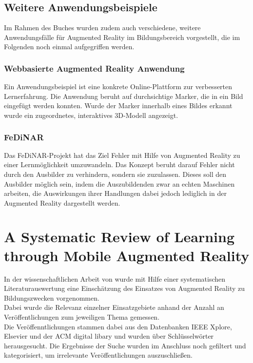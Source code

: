 \subsection{Weitere Anwendungsbeispiele}
Im Rahmen des Buches wurden zudem auch verschiedene, weitere Anwendungsfälle für Augmented Reality im Bildungsbereich vorgestellt, die im Folgenden noch einmal aufgegriffen werden. 

\subsubsection{Webbasierte Augmented Reality Anwendung}
Ein Anwendungsbeispiel ist eine konkrete Online-Plattform zur verbesserten Lernerfahrung. Die Anwendung beruht auf \glqq durchsichtige\grqq{} Marker, die in ein Bild eingefügt werden konnten. Wurde der Marker innerhalb eines Bildes erkannt wurde ein zugeordnetes, interaktives 3D-Modell angezeigt. \citep[Kapitel 3]{geroimenko:ar-in-education}

\subsubsection{FeDiNAR}
Das FeDiNAR-Projekt hat das Ziel Fehler mit Hilfe von Augmented Reality zu einer Lernmöglichkeit umzuwandeln. Das Konzept beruht darauf Fehler nicht durch den Ausbilder zu verhindern, sondern sie zuzulassen. Dieses soll den Ausbilder möglich sein, indem die Auszubildenden zwar an echten Maschinen arbeiten, die Auswirkungen ihrer Handlungen dabei jedoch lediglich in der Augmented Reality dargestellt werden. 
\citep[Kapitel 5]{geroimenko:ar-in-education}

\section{A Systematic Review of Learning through Mobile Augmented Reality}
In der wissenschaftlichen Arbeit von \citeauthor{hedberg:review-ar-learning} \citep{hedberg:review-ar-learning} wurde mit Hilfe einer systematischen Literaturauswertung eine Einschätzung des Einsatzes von Augmented Reality zu Bildungszwecken vorgenommen. \\
Dabei wurde die Relevanz einzelner Einsatzgebiete anhand der Anzahl an Veröffentlichungen zum jeweiligen Thema gemessen.\\ Die Veröffenntlichungen stammen dabei aus den Datenbanken \glqq IEEE Xplore\grqq , \glqq Elsevier\grqq{} und der \glqq ACM digital libary\grqq{} und wurden über Schlüsselwörter herausgesucht. Die Ergebnisse der Suche wurden im Anschluss noch gefiltert und kategorisiert, um irrelevante Veröffentlichungen auszuschließen.
